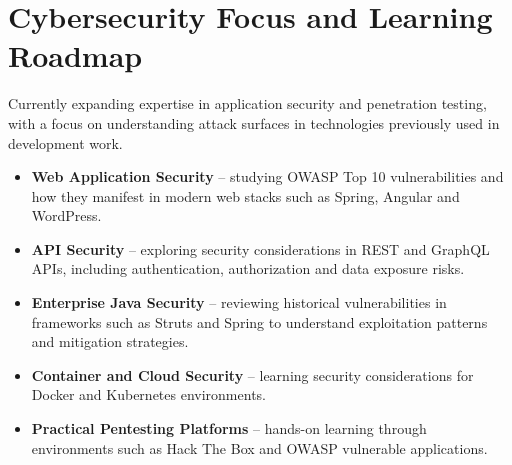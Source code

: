\section{Cybersecurity Focus and Learning Roadmap}

Currently expanding expertise in application security and penetration testing,
with a focus on understanding attack surfaces in technologies previously used in development work.

\begin{itemize}

\item \textbf{Web Application Security} – studying OWASP Top 10 vulnerabilities and how they manifest in modern web stacks such as Spring, Angular and WordPress.

\item \textbf{API Security} – exploring security considerations in REST and GraphQL APIs, including authentication, authorization and data exposure risks.

\item \textbf{Enterprise Java Security} – reviewing historical vulnerabilities in frameworks such as Struts and Spring to understand exploitation patterns and mitigation strategies.

\item \textbf{Container and Cloud Security} – learning security considerations for Docker and Kubernetes environments.

\item \textbf{Practical Pentesting Platforms} – hands-on learning through environments such as Hack The Box and OWASP vulnerable applications.

\end{itemize}
